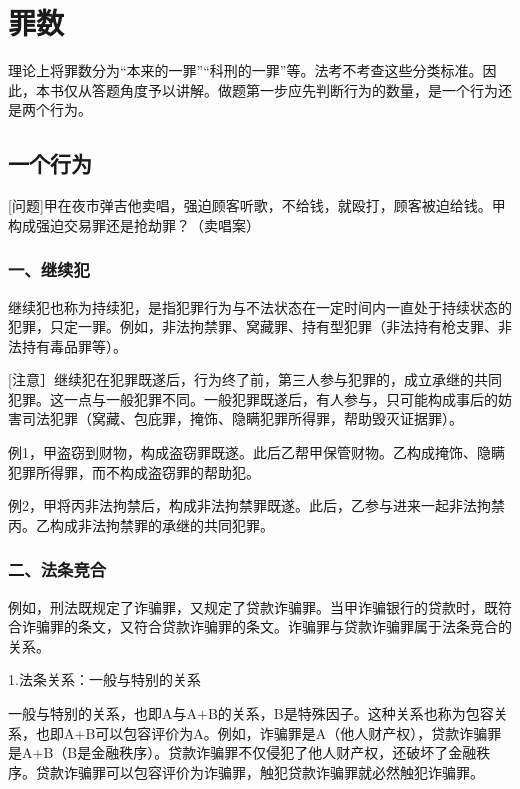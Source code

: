 \chapter{罪数}

\begin{EditionOpeningPanel}
理论上将罪数分为“本来的一罪”“科刑的一罪”等。法考不考查这些分类标准。因此，本书仅从答题角度予以讲解。做题第一步应先判断行为的数量，是一个行为还是两个行为。
\end{EditionOpeningPanel}

\section{一个行为}

[问题]甲在夜市弹吉他卖唱，强迫顾客听歌，不给钱，就殴打，顾客被迫给钱。甲构成强迫交易罪还是抢劫罪？（卖唱案）

\subsection*{一、继续犯}

继续犯也称为持续犯，是指犯罪行为与不法状态在一定时间内一直处于持续状态的犯罪，只定一罪。例如，非法拘禁罪、窝藏罪、持有型犯罪（非法持有枪支罪、非法持有毒品罪等）。

[注意］继续犯在犯罪既遂后，行为终了前，第三人参与犯罪的，成立承继的共同犯罪。这一点与一般犯罪不同。一般犯罪既遂后，有人参与，只可能构成事后的妨害司法犯罪（窝藏、包庇罪，掩饰、隐瞒犯罪所得罪，帮助毁灭证据罪）。

例1，甲盗窃到财物，构成盗窃罪既遂。此后乙帮甲保管财物。乙构成掩饰、隐瞒犯罪所得罪，而不构成盗窃罪的帮助犯。

例2，甲将丙非法拘禁后，构成非法拘禁罪既遂。此后，乙参与进来一起非法拘禁丙。乙构成非法拘禁罪的承继的共同犯罪。

\subsection*{二、法条竞合}

例如，刑法既规定了诈骗罪，又规定了贷款诈骗罪。当甲诈骗银行的贷款时，既符合诈骗罪的条文，又符合贷款诈骗罪的条文。诈骗罪与贷款诈骗罪属于法条竞合的关系。

1.法条关系：一般与特别的关系

一般与特别的关系，也即A与A+B的关系，B是特殊因子。这种关系也称为包容关系，也即A+B可以包容评价为A。例如，诈骗罪是A（他人财产权），贷款诈骗罪是A+B（B是金融秩序）。贷款诈骗罪不仅侵犯了他人财产权，还破坏了金融秩序。贷款诈骗罪可以包容评价为诈骗罪，触犯贷款诈骗罪就必然触犯诈骗罪。

